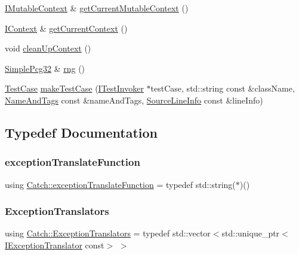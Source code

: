\begin{DoxyCompactItemize}
\mbox{\hyperlink{struct_catch_1_1_i_mutable_context}{I\+Mutable\+Context}} \& \mbox{\hyperlink{namespace_catch_af7bb0c32ab2453d2f53e92a96d15360e}{get\+Current\+Mutable\+Context}} ()
\item 
\mbox{\hyperlink{struct_catch_1_1_i_context}{I\+Context}} \& \mbox{\hyperlink{namespace_catch_ad517cca9b21deb79101e90e5508dd161}{get\+Current\+Context}} ()
\item 
void \mbox{\hyperlink{namespace_catch_ae50508f10ffc4ed873a31a4db4caea16}{clean\+Up\+Context}} ()
\item 
\mbox{\hyperlink{class_catch_1_1_simple_pcg32}{Simple\+Pcg32}} \& \mbox{\hyperlink{namespace_catch_aa184a4efe2aea62236528357d9342077}{rng}} ()
\item 
\mbox{\hyperlink{class_catch_1_1_test_case}{Test\+Case}} \mbox{\hyperlink{namespace_catch_a5e63df38d06a43d4cee17454e724b5c0}{make\+Test\+Case}} (\mbox{\hyperlink{struct_catch_1_1_i_test_invoker}{I\+Test\+Invoker}} $\ast$test\+Case, std\+::string const \&class\+Name, \mbox{\hyperlink{struct_catch_1_1_name_and_tags}{Name\+And\+Tags}} const \&name\+And\+Tags, \mbox{\hyperlink{struct_catch_1_1_source_line_info}{Source\+Line\+Info}} const \&line\+Info)
\end{DoxyCompactItemize}


\subsection{Typedef Documentation}
\mbox{\label{namespace_catch_ae8d8673884dc36b98875106322a2a37b}} 
\subsubsection{\texorpdfstring{exception\+Translate\+Function}{exceptionTranslateFunction}}
{\footnotesize\ttfamily using \mbox{\hyperlink{namespace_catch_ae8d8673884dc36b98875106322a2a37b}{Catch\+::exception\+Translate\+Function}} = typedef std\+::string($\ast$)()}

\mbox{\label{namespace_catch_a7ad07967e688fdc03cf784f58be4b741}} 
\subsubsection{\texorpdfstring{Exception\+Translators}{ExceptionTranslators}}
{\footnotesize\ttfamily using \mbox{\hyperlink{namespace_catch_a7ad07967e688fdc03cf784f58be4b741}{Catch\+::\+Exception\+Translators}} = typedef std\+::vector$<$std\+::unique\+\_\+ptr$<$\mbox{\hyperlink{struct_catch_1_1_i_exception_translator}{I\+Exception\+Translator}} const$>$ $>$}

